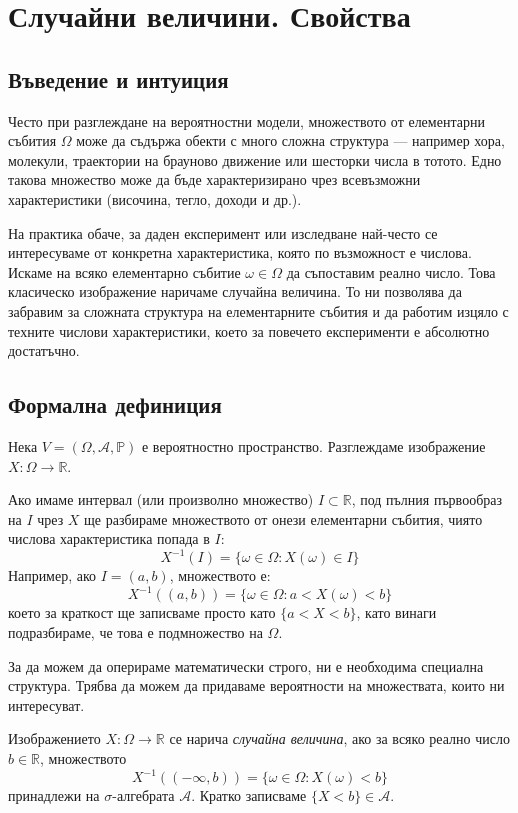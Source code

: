 \section{Случайни величини. Свойства}

\subsection{Въведение и интуиция}
Често при разглеждане на вероятностни модели, множеството от елементарни събития $\Omega$ може да съдържа обекти с много сложна структура — например хора, молекули, траектории на брауново движение или шесторки числа в тотото. Едно такова множество може да бъде характеризирано чрез всевъзможни характеристики (височина, тегло, доходи и др.).

На практика обаче, за даден експеримент или изследване най-често се интересуваме от конкретна характеристика, която по възможност е числова. Искаме на всяко елементарно събитие $\omega \in \Omega$ да съпоставим реално число. Това класическо изображение наричаме случайна величина. То ни позволява да забравим за сложната структура на елементарните събития и да работим изцяло с техните числови характеристики, което за повечето експерименти е абсолютно достатъчно.

\subsection{Формална дефиниция}
Нека $V = (\Omega, \mathcal{A}, \mathbb{P})$ е вероятностно пространство.
Разглеждаме изображение $X: \Omega \rightarrow \mathbb{R}$.

Ако имаме интервал (или произволно множество) $I \subset \mathbb{R}$, под пълния първообраз на $I$ чрез $X$ ще разбираме множеството от онези елементарни събития, чиято числова характеристика попада в $I$:
\[ X^{-1}(I) = \{ \omega \in \Omega : X(\omega) \in I \} \]
Например, ако $I = (a, b)$, множеството е:
\[ X^{-1}((a, b)) = \{ \omega \in \Omega : a < X(\omega) < b \} \]
което за краткост ще записваме просто като $\{ a < X < b \}$, като винаги подразбираме, че това е подмножество на $\Omega$.

За да можем да оперираме математически строго, ни е необходима специална структура. Трябва да можем да придаваме вероятности на множествата, които ни интересуват.

\begin{keydefn}
Изображението $X: \Omega \rightarrow \mathbb{R}$ се нарича \emph{случайна величина}, ако за всяко реално число $b \in \mathbb{R}$, множеството
\[ X^{-1}((-\infty, b)) = \{ \omega \in \Omega : X(\omega) < b \} \]
принадлежи на $\sigma$-алгебрата $\mathcal{A}$. Кратко записваме $\{ X < b \} \in \mathcal{A}$.
\end{keydefn}

